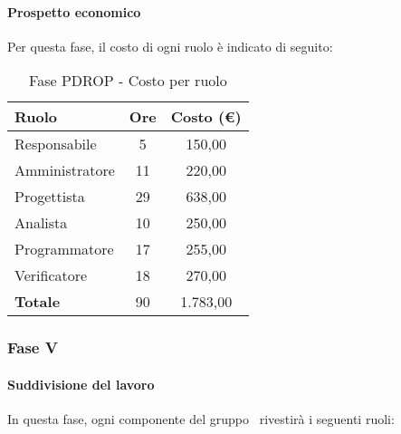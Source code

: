 \documentclass[../PianoProgetto.tex]{subfiles}
\begin{document}
	\paragraph{Prospetto economico}
					Per questa fase, il costo di ogni ruolo è indicato di seguito:
	\begin{table}[h]
		\centering
	
		\begin{tabular}{l * {2}{c}}
			\toprule
			\textbf{Ruolo} & \textbf{Ore} & \textbf{Costo (\euro{})} \\
			\midrule
			Responsabile &	5 & 150,00 \\
			Amministratore & 11 & 220,00 \\
			Progettista & 29 & 638,00 \\
			Analista & 10 & 250,00 \\
			Programmatore & 17 & 255,00 \\
			Verificatore & 18 & 270,00 \\
			\midrule		
			\textbf{Totale} & 90 & 1.783,00 \\
			\bottomrule
			
		\end{tabular}
		
		\caption{Fase PDROP - Costo per ruolo}
		\label{tab:fasePDROP_costo}
		
	\end{table}
	
	\subsubsection{Fase V}
				\paragraph{Suddivisione del lavoro}
					In questa fase, ogni componente del gruppo \leaf\ rivestirà i seguenti ruoli:
	
\end{document}
